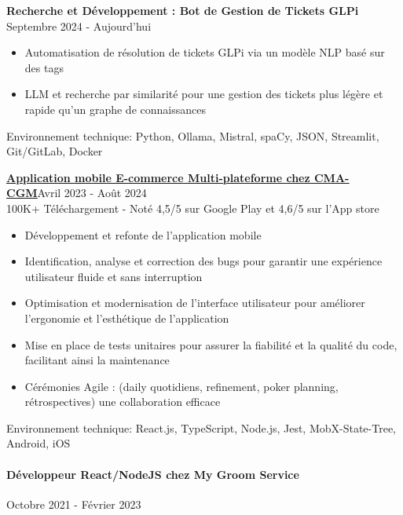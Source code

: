 \documentclass{article}
\begin{document}
\noindent
\textbf{Recherche et Développement : Bot de Gestion de Tickets GLPi} \hspace*{\fill}Septembre 2024 - Aujourd'hui

\raggedright 
\begin{itemize}
  \item{Automatisation de résolution de tickets GLPi via un modèle NLP basé sur des tags}
  \item{LLM et recherche par similarité pour une gestion des tickets plus légère et rapide qu’un graphe de connaissances}
\end{itemize}
\noindent
\vspace{1ex}
Environnement technique: Python, Ollama, Mistral, spaCy, JSON, Streamlit, Git/GitLab, Docker

\noindent
\href{https://www.cma-cgm.fr/products-services/ecommerce/applicationmobile}{\textbf{\underline{Application mobile E-commerce Multi-plateforme chez CMA-CGM}}}\hspace*{\fill}Avril 2023 - Août 2024  \\
100K+ Téléchargement - Noté 4,5/5 sur Google Play et 4,6/5 sur l'App store

\raggedright  
\begin{itemize}
  \item{Développement et refonte de l’application mobile}
  \item{Identification, analyse et correction des bugs pour garantir une expérience utilisateur fluide et
    sans interruption}
  \item{Optimisation et modernisation de l'interface utilisateur pour améliorer l'ergonomie et l'esthétique
    de l'application}
  \item{Mise en place de tests unitaires pour assurer la fiabilité et la qualité du code, facilitant ainsi la
    maintenance}
  \item{Cérémonies Agile : (daily quotidiens, refinement, poker planning, rétrospectives) une collaboration efficace}
\end{itemize}
\noindent
Environnement technique: React.js, TypeScript, Node.js, Jest, MobX-State-Tree, Android, iOS
\paragraph{Développeur React/NodeJS chez My Groom Service}\hspace*{\fill}Octobre 2021 - Février 2023
\end{document}
